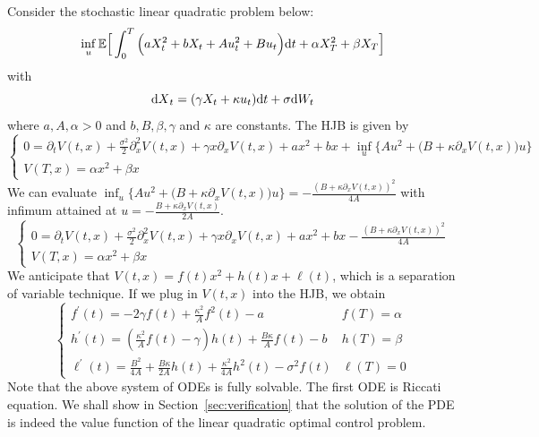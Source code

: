 \documentclass[11pt]{book}
\newcommand{\dt}{\text{\normalfont d}t}
\newcommand{\dX}{\text{\normalfont d}X}
\newcommand{\dW}{\text{\normalfont d}W}
\begin{document}
\begin{eg}\label{eg:LQ_drift}
    Consider the stochastic linear quadratic problem below:
    \begin{equation}
        \inf_u\mathbb{E}\Big[\int_0^T \Big(aX_t^2+bX_t +Au_t^2 + Bu_t\Big){\dt}+\alpha X_T^2+\beta X_T\Big]
    \end{equation}
    with
    \begin{equation}
        {\dX}_t=(\gamma X_t+\kappa u_t){{\dt}}+\sigma \dW_t
    \end{equation}
where $a,A, \alpha>0$ and $b,B,\beta,\gamma$ and $\kappa$ are constants. The HJB is given by 
\begin{equation}
    \begin{cases}
        0=\partial_t V(t,x) +\frac{\sigma^2}{2}\partial^2_x V(t,x)+ \gamma x\partial_x V(t,x) + a x^2 + bx +\inf_{u}\Big\{Au^2 +\big(B+\kappa\partial_x V(t,x)\big)u \Big\}\\
        V(T,x)=\alpha x^2 + \beta x
    \end{cases}
\end{equation}
We can evaluate
$\inf_u\{Au^2 +\big(B+\kappa\partial_x V(t,x)\big)u\} = -\frac{(B+\kappa\partial_x V(t,x))^2}{4A}$ with infimum attained at $u =-\frac{B+\kappa\partial_x V(t,x)}{2A}$.
\begin{equation}
    \begin{cases}
        0=\partial_t V(t,x) +\frac{\sigma^2}{2}\partial^2_x V(t,x)+ \gamma x\partial_x V(t,x) + a x^2 + bx -\frac{(B+\kappa\partial_x V(t,x))^2}{4A}\\
        V(T,x)=\alpha x^2 + \beta x
    \end{cases}
\end{equation}
We anticipate that $V(t,x)=f(t)x^2+h(t)x+\ell(t)$, which is a separation of variable technique. If we plug in $V(t,x)$  into the HJB, we obtain
\begin{equation}
    \begin{cases}
       f^\prime(t) = -2\gamma f(t) + \frac{\kappa^2}{A}f^{2}(t) -a& f(T)=\alpha\\
       h^{\prime}(t)= (\frac{\kappa^2}{A}f(t)-\gamma)h(t)+\frac{B\kappa}{A}f(t)-b& h(T)=\beta\\
       \ell^{\prime}(t)=\frac{B^2}{4A}+\frac{B\kappa}{2A}h(t)+\frac{\kappa^2}{4A}h^2(t)-\sigma^2f(t)&\ell(T)=0
    \end{cases}
\end{equation}
Note that the above system of ODEs is fully solvable. The first ODE is Riccati equation.
We shall show in Section~\ref{sec:verification} that the solution of the PDE is indeed the value function of the linear quadratic optimal control problem.
\end{eg}
\end{document}
